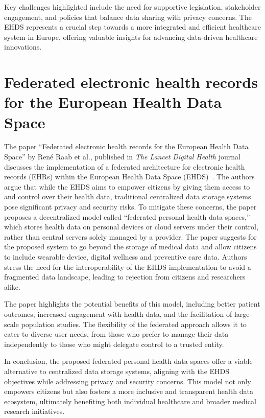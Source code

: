 Key challenges highlighted include the need for supportive legislation, stakeholder engagement, and policies that balance data sharing with privacy concerns.
The EHDS represents a crucial step towards a more integrated and efficient healthcare system in Europe, offering valuable insights for advancing data-driven healthcare innovations.

\section{Federated electronic health records for the European Health Data Space}\label{sec:federated-electronic-health-records-for-the-european-health-data-space}

The paper ``Federated electronic health records for the European Health Data Space'' by René Raab et al., published in \textit{The Lancet Digital Health} journal discusses the implementation of a federated architecture for electronic health records (EHRs) within the European Health Data Space (EHDS)~\cite{raab_federated_2023}.
The authors argue that while the EHDS aims to empower citizens by giving them access to and control over their health data, traditional centralized data storage systems pose significant privacy and security risks.
To mitigate these concerns, the paper proposes a decentralized model called ``federated personal health data spaces,'' which stores health data on personal devices or cloud servers under their control, rather than central servers solely managed by a provider.
The paper suggests for the proposed system to go beyond the storage of medical data and allow citizens to include wearable device, digital wellness and preventive care data.
Authors stress the need for the interoperability of the EHDS implementation to avoid a fragmented data landscape, leading to rejection from citizens and researchers alike.

The paper highlights the potential benefits of this model, including better patient outcomes, increased engagement with health data, and the facilitation of large-scale population studies.
The flexibility of the federated approach allows it to cater to diverse user needs, from those who prefer to manage their data independently to those who might delegate control to a trusted entity.

In conclusion, the proposed federated personal health data spaces offer a viable alternative to centralized data storage systems, aligning with the EHDS objectives while addressing privacy and security concerns.
This model not only empowers citizens but also fosters a more inclusive and transparent health data ecosystem, ultimately benefiting both individual healthcare and broader medical research initiatives.


